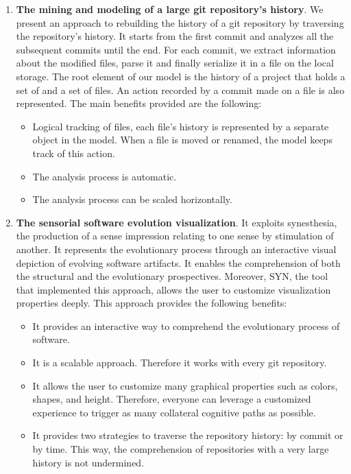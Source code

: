 \begin{enumerate}
    \item \textbf{The mining and modeling of a large git repository's history}. We present an approach to rebuilding the history of a git repository by traversing the repository's history. It starts from the first commit and analyzes all the subsequent commits until the end.
    For each commit, we extract information about the modified files, parse it and finally serialize it in a file on the local storage. The root element of our model is the history of a project that holds a set of and a set of files. An action recorded by a commit made on a file is also represented. The main benefits provided are the following: \begin{itemize}
        \item Logical tracking of files, each file's history is represented by a separate object in the model. When a file is moved or renamed, the model keeps track of this action. 
        \item The analysis process is automatic. 
        \item The analysis process can be scaled horizontally. 
    \end{itemize}
    \item \textbf{The sensorial software evolution visualization}. It exploits synesthesia, the production of a sense impression relating to one sense by stimulation of another. It represents the evolutionary process through an interactive visual depiction of evolving software artifacts. It enables the comprehension of both the structural and the evolutionary prospectives. Moreover, SYN, the tool that implemented this approach, allows the user to customize visualization properties deeply. This approach provides the following benefits:
    \begin{itemize}
        \item It provides an interactive way to comprehend the evolutionary process of software.
        \item It is a scalable approach. Therefore it works with every git repository. 
        \item It allows the user to customize many graphical properties such as colors, shapes, and height. Therefore, everyone can leverage a customized experience to trigger as many collateral cognitive paths as possible. 
        \item It provides two strategies to traverse the repository history: by commit or by time. This way, the comprehension of repositories with a very large history is not undermined. 

\end{itemize}
\end{enumerate}
